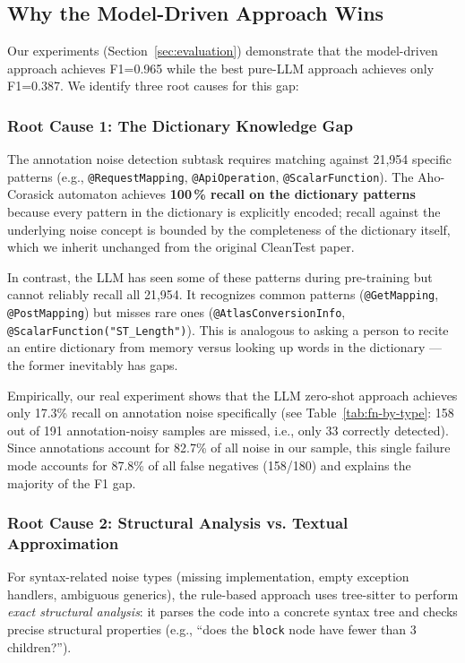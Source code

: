 \documentclass[acmlarge,nonacm,screen]{acmart}
\begin{document}
\subsection{Why the Model-Driven Approach Wins}

Our experiments (Section~\ref{sec:evaluation}) demonstrate that the model-driven approach achieves F1=0.965 while the best pure-LLM approach achieves only F1=0.387. We identify three root causes for this gap:

\subsubsection{Root Cause 1: The Dictionary Knowledge Gap}

The annotation noise detection subtask requires matching against 21,954 specific patterns (e.g., \texttt{@RequestMapping}, \texttt{@ApiOperation}, \texttt{@ScalarFunction}). The Aho-Corasick automaton achieves \textbf{100\,\% recall on the dictionary patterns} because every pattern in the dictionary is explicitly encoded; recall against the underlying noise concept is bounded by the completeness of the dictionary itself, which we inherit unchanged from the original CleanTest paper.

In contrast, the LLM has seen some of these patterns during pre-training but cannot reliably recall all 21,954. It recognizes common patterns (\texttt{@GetMapping}, \texttt{@PostMapping}) but misses rare ones (\texttt{@AtlasConversionInfo}, \texttt{@ScalarFunction("ST\_Length")}). This is analogous to asking a person to recite an entire dictionary from memory versus looking up words in the dictionary --- the former inevitably has gaps.

Empirically, our real experiment shows that the LLM zero-shot approach achieves only 17.3\% recall on annotation noise specifically (see Table~\ref{tab:fn-by-type}: 158 out of 191 annotation-noisy samples are missed, i.e., only 33 correctly detected). Since annotations account for 82.7\% of all noise in our sample, this single failure mode accounts for 87.8\% of all false negatives (158/180) and explains the majority of the F1 gap.

\subsubsection{Root Cause 2: Structural Analysis vs. Textual Approximation}

For syntax-related noise types (missing implementation, empty exception handlers, ambiguous generics), the rule-based approach uses tree-sitter to perform \textit{exact structural analysis}: it parses the code into a concrete syntax tree and checks precise structural properties (e.g., ``does the \texttt{block} node have fewer than 3 children?'').
\end{document}
